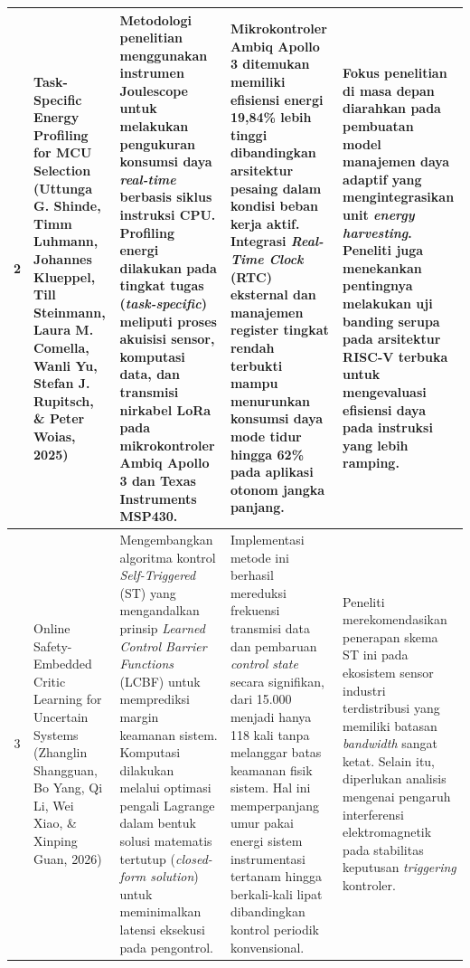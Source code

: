 \documentclass[12pt,a4paper]{article}
\begin{document}
\begin{small}
\begin{longtable}{|c|>{\raggedright\arraybackslash}p{3cm}|>{\raggedright\arraybackslash}p{4cm}|>{\raggedright\arraybackslash}p{4cm}|>{\raggedright\arraybackslash}p{4cm}|}
2 & Task-Specific Energy Profiling for MCU Selection (Uttunga G. Shinde, Timm Luhmann, Johannes Klueppel, Till Steinmann, Laura M. Comella, Wanli Yu, Stefan J. Rupitsch, \& Peter Woias, 2025) & Metodologi penelitian menggunakan instrumen Joulescope untuk melakukan pengukuran konsumsi daya \textit{real-time} berbasis siklus instruksi CPU. Profiling energi dilakukan pada tingkat tugas (\textit{task-specific}) meliputi proses akuisisi sensor, komputasi data, dan transmisi nirkabel LoRa pada mikrokontroler Ambiq Apollo 3 dan Texas Instruments MSP430. & Mikrokontroler Ambiq Apollo 3 ditemukan memiliki efisiensi energi 19,84\% lebih tinggi dibandingkan arsitektur pesaing dalam kondisi beban kerja aktif. Integrasi \textit{Real-Time Clock} (RTC) eksternal dan manajemen register tingkat rendah terbukti mampu menurunkan konsumsi daya mode tidur hingga 62\% pada aplikasi otonom jangka panjang. & Fokus penelitian di masa depan diarahkan pada pembuatan model manajemen daya adaptif yang mengintegrasikan unit \textit{energy harvesting}. Peneliti juga menekankan pentingnya melakukan uji banding serupa pada arsitektur RISC-V terbuka untuk mengevaluasi efisiensi daya pada instruksi yang lebih ramping. \\ \hline

3 & Online Safety-Embedded Critic Learning for Uncertain Systems (Zhanglin Shangguan, Bo Yang, Qi Li, Wei Xiao, \& Xinping Guan, 2026) & Mengembangkan algoritma kontrol \textit{Self-Triggered} (ST) yang mengandalkan prinsip \textit{Learned Control Barrier Functions} (LCBF) untuk memprediksi margin keamanan sistem. Komputasi dilakukan melalui optimasi pengali Lagrange dalam bentuk solusi matematis tertutup (\textit{closed-form solution}) untuk meminimalkan latensi eksekusi pada pengontrol. & Implementasi metode ini berhasil mereduksi frekuensi transmisi data dan pembaruan \textit{control state} secara signifikan, dari 15.000 menjadi hanya 118 kali tanpa melanggar batas keamanan fisik sistem. Hal ini memperpanjang umur pakai energi sistem instrumentasi tertanam hingga berkali-kali lipat dibandingkan kontrol periodik konvensional. & Peneliti merekomendasikan penerapan skema ST ini pada ekosistem sensor industri terdistribusi yang memiliki batasan \textit{bandwidth} sangat ketat. Selain itu, diperlukan analisis mengenai pengaruh interferensi elektromagnetik pada stabilitas keputusan \textit{triggering} kontroler. \\ \hline


\end{longtable}
\end{small}
\end{document}
